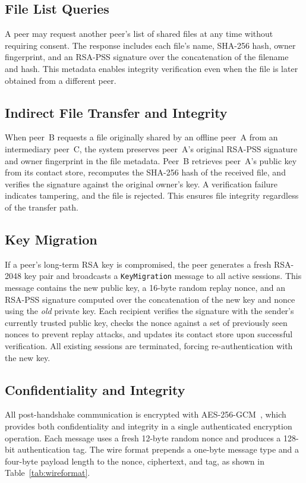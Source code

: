 \documentclass[sigconf,nonacm]{acmart}
\begin{document}
\subsection{File List Queries}

A peer may request another peer's list of shared files at any time without requiring consent.
The response includes each file's name, SHA-256 hash, owner fingerprint, and an RSA-PSS signature over the concatenation of the filename and hash.
This metadata enables integrity verification even when the file is later obtained from a different peer.

\subsection{Indirect File Transfer and Integrity}

When peer~B requests a file originally shared by an offline peer~A from an intermediary peer~C, the system preserves peer~A's original RSA-PSS signature and owner fingerprint in the file metadata.
Peer~B retrieves peer~A's public key from its contact store, recomputes the SHA-256 hash of the received file, and verifies the signature against the original owner's key.
A verification failure indicates tampering, and the file is rejected.
This ensures file integrity regardless of the transfer path.

\subsection{Key Migration}

If a peer's long-term RSA key is compromised, the peer generates a fresh RSA-2048 key pair and broadcasts a \texttt{KeyMigration} message to all active sessions.
This message contains the new public key, a 16-byte random replay nonce, and an RSA-PSS signature computed over the concatenation of the new key and nonce using the \emph{old} private key.
Each recipient verifies the signature with the sender's currently trusted public key, checks the nonce against a set of previously seen nonces to prevent replay attacks, and updates its contact store upon successful verification.
All existing sessions are terminated, forcing re-authentication with the new key.

\subsection{Confidentiality and Integrity}

All post-handshake communication is encrypted with AES-256-GCM~\cite{paar2024}, which provides both confidentiality and integrity in a single authenticated encryption operation.
Each message uses a fresh 12-byte random nonce and produces a 128-bit authentication tag.
The wire format prepends a one-byte message type and a four-byte payload length to the nonce, ciphertext, and tag, as shown in Table~\ref{tab:wireformat}.
\end{document}
